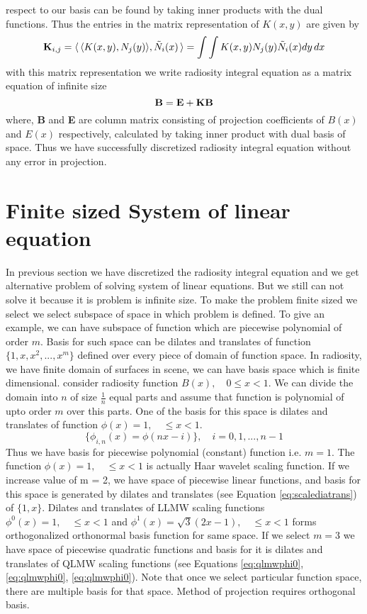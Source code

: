 respect to our basis can be found by taking inner products with the dual functions. Thus the entries in the matrix representation
of $K(x,y)$ are given by\\
\begin{equation}\label{eq:kijcalc}
{\bf K}_{i,j}=\langle\, \langle K(x,y),N_j(y)\rangle,\tilde{N}_i(x) \,\rangle =\int \int K(x,y)N_j(y)\tilde{N}_i(x) dy\,dx
\end{equation}
with this matrix representation we write radiosity integral equation as a  matrix equation of infinite size\\
\begin{equation}\label{eq:systemeq}
\bf{B=E+KB}
\end{equation}
where, {\bf B} and {\bf E} are column matrix consisting of projection coefficients of $B(x)$ and $E(x)$ respectively, calculated by taking inner product with dual basis of space. Thus we have successfully discretized radiosity integral equation without any error in projection.

\section{Finite sized System of linear equation}
In previous section we have discretized the radiosity integral equation and we get alternative problem of solving system of linear equations. But we still can not solve it because it is problem is infinite size. To make the problem finite sized we select we select subspace of space in which problem is defined. To give an example, we can have subspace of function which are piecewise polynomial of order $m$. Basis for such space can be dilates and translates of function $\{1,x,x^2,...,x^m\}$ defined over every piece of domain of function space. In radiosity, we have finite domain of surfaces in scene, we can have basis space which is finite dimensional. consider radiosity function $B(x), \quad 0 \leq x < 1$. We can divide the domain into $n$ of size $\frac{1}{n}$ equal parts and assume that function is polynomial of upto order $m$ over this parts. One of the basis for this space is dilates and translates of function $\phi(x)=1, \quad \leq x < 1$. 
\begin{equation}\label{eq:scalediatrans}
    \{\phi_{i,n}(x)=\phi(nx-i)\},\quad i=0,1,...,n-1
\end{equation} 
Thus we have basis for piecewise polynomial (constant) function i.e. $m=1$. The function $\phi(x)=1, \quad \leq x < 1$ is actually Haar wavelet scaling function. If we increase value of m = 2, we have space of piecewise linear functions, and basis for this space is generated by dilates and translates (see Equation \ref{eq:scalediatrans}) of $\{1,x\}$. Dilates and translates of LLMW scaling functions $\phi^0(x)=1, \quad \leq x < 1$ and $\phi^1(x)=\sqrt{3}(2x-1), \quad \leq x < 1$ forms orthogonalized orthonormal basis function for same space.  If we select $m= 3$ we have space of piecewise quadratic functions and basis for it is dilates and translates of QLMW scaling functions (see Equations \ref{eq:qlmwphi0}, \ref{eq:qlmwphi0}, \ref{eq:qlmwphi0}). Note that once we select particular function space, there are multiple basis for that space. Method of projection requires orthogonal basis. 
